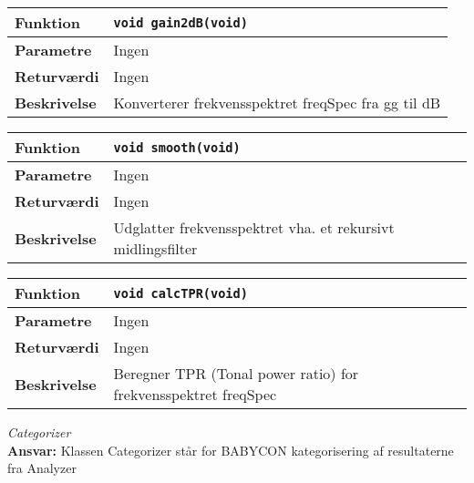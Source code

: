 \begin{center}
    \begin{tabular}{ | l | p{} |}
    \hline
    \textbf{Funktion}	& \verb+void gain2dB(void) +						\\ \hline
    \textbf{Parametre} 	& Ingen		\\ \hline
    \textbf{Returværdi}	& Ingen							\\ \hline
    \textbf{Beskrivelse}& Konverterer frekvensspektret freqSpec fra gg til dB \\ \hline
    \end{tabular}
\end{center}  

\begin{center}
    \begin{tabular}{ | l | p{} |}
    \hline
    \textbf{Funktion}	& \verb+void smooth(void) +						\\ \hline
    \textbf{Parametre} 	& Ingen		\\ \hline
    \textbf{Returværdi}	& Ingen							\\ \hline
    \textbf{Beskrivelse}& Udglatter frekvensspektret vha. et rekursivt midlingsfilter  \\ \hline
    \end{tabular}
\end{center}

\begin{center}
    \begin{tabular}{ | l | p{} |}
    \hline
    \textbf{Funktion}	& \verb+void calcTPR(void) +						\\ \hline
    \textbf{Parametre} 	& Ingen		\\ \hline
    \textbf{Returværdi}	& Ingen							\\ \hline
    \textbf{Beskrivelse}& Beregner TPR (Tonal power ratio) for frekvensspektret freqSpec  \\ \hline
    \end{tabular}
\end{center} 


\textit{Categorizer} \\
\textbf{Ansvar:} Klassen Categorizer står for BABYCON kategorisering af resultaterne fra Analyzer

